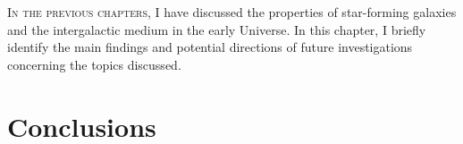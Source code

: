     \BgThispage
    
    \fancyhf{}
    \fancyfoot[C]{\color{white}\thepage}
    \newpage
    \setFancyHdr
\fi

\lettrine{I}{n the previous chapters}, I have discussed the properties of star-forming galaxies and the intergalactic medium in the early Universe. In this chapter, I briefly identify the main findings and potential directions of future investigations concerning the topics discussed.

\section{Conclusions}

